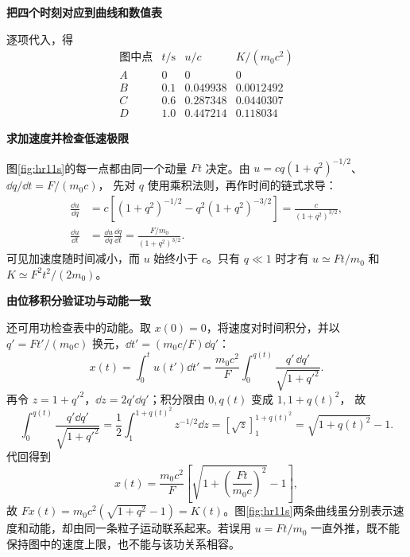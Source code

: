 \begin{solution}
\par\medskip{}\noindent\textbf{把四个时刻对应到曲线和数值表}\par\nobreak
逐项代入，得
\[
\begin{array}{c|c|c|c}
\text{图中点}&t/\mathrm s&u/c&K/(m_0c^2)\\\hline
A&0&0&0\\
B&0.1&0.049938&0.0012492\\
C&0.6&0.287348&0.0440307\\
D&1.0&0.447214&0.118034
\end{array}
\]


\par\medskip{}\noindent\textbf{求加速度并检查低速极限}\par\nobreak
图\ref{fig:hr11s}的每一点都由同一个动量 $Ft$ 决定。由 $u=cq(1+q^2)^{-1/2}$、$\dd q/\dd t=F/(m_0c)$，
先对 $q$ 使用乘积法则，再作时间的链式求导：
\begin{align*}
 \frac{\dd u}{\dd q}
 &=c\left[(1+q^2)^{-1/2}-q^2(1+q^2)^{-3/2}\right]
 =\frac{c}{(1+q^2)^{3/2}},\\
 \frac{\dd u}{\dd t}
 &=\frac{\dd u}{\dd q}\frac{\dd q}{\dd t}
 =\frac{F/m_0}{(1+q^2)^{3/2}}.
\end{align*}
可见加速度随时间减小，而 $u$ 始终小于 $c$。只有 $q\ll1$ 时才有 $u\simeq Ft/m_0$ 和 $K\simeq F^2t^2/(2m_0)$。


\par\medskip{}\noindent\textbf{由位移积分验证功与动能一致}\par\nobreak
还可用功检查表中的动能。取 $x(0)=0$，将速度对时间积分，并以
$q'=Ft'/(m_0c)$ 换元，$\dd t'=(m_0c/F)\dd q'$：
\[
 x(t)=\int_0^t u(t')\dd t'
 =\frac{m_0c^2}{F}\int_0^{q(t)}
       \frac{q'\,\dd q'}{\sqrt{1+q'^2}}.
\]
再令 $z=1+q'^2$，$\dd z=2q'\dd q'$；积分限由 $0,q(t)$ 变成 $1,1+q(t)^2$，
故
\[
 \int_0^{q(t)}\frac{q'\dd q'}{\sqrt{1+q'^2}}
 =\frac12\int_1^{1+q(t)^2}z^{-1/2}\dd z
 =[\sqrt z]_1^{1+q(t)^2}
 =\sqrt{1+q(t)^2}-1.
\]
代回得到
\[
 x(t)=\frac{m_0c^2}{F}\left[\sqrt{1+\left(\frac{Ft}{m_0c}\right)^2}-1\right],
\]
故 $Fx(t)=m_0c^2(\sqrt{1+q^2}-1)=K(t)$。图\ref{fig:hr11s}两条曲线虽分别表示速度和动能，却由同一条粒子运动联系起来。若误用 $u=Ft/m_0$ 一直外推，既不能保持图中的速度上限，也不能与该功关系相容。
\end{solution}

